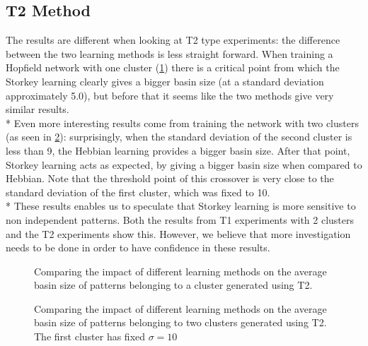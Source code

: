 \clearpage
\subsection{T2 Method}

The results are different when looking at T2 type experiments:
the difference between the two learning methods is less straight forward.
When training a Hopfield network with one cluster (\ref{fig:plot-storkey-T2-onecluster})  there is a critical point from which the Storkey learning clearly gives a bigger basin size
(at a standard deviation approximately 5.0), but before that it seems like the two methods give very similar results.
\\*
Even more interesting results come from training the network with two clusters (as seen in \ref{fig:plot-storkey-T2-twoclusters}): surprisingly, when the standard deviation of the second cluster
is less than 9, the Hebbian learning provides a bigger basin size. After that point, Storkey learning acts as expected, by giving a
bigger basin size when compared to Hebbian. Note that the threshold point of this crossover is very close to the standard deviation of the first
cluster, which was fixed to 10.
\\* These results enables us to speculate that Storkey learning is more sensitive to non independent patterns. Both the results from T1 experiments with
2 clusters and the T2 experiments show this. However, we believe that more investigation needs to be done in order to have confidence in these results.


\begin{figure}[!ht]
  \centering
  
\caption{Comparing the impact of different learning methods on the average basin size of patterns belonging to a cluster generated using T2.}
\label{fig:plot-storkey-T2-onecluster}
\end{figure}

\begin{figure}[!ht]
  \centering
  
\caption{Comparing the impact of different learning methods on the average basin size of patterns belonging to two clusters generated using T2. The first cluster has fixed $\sigma = 10$}
\label{fig:plot-storkey-T2-twoclusters}
\end{figure}
